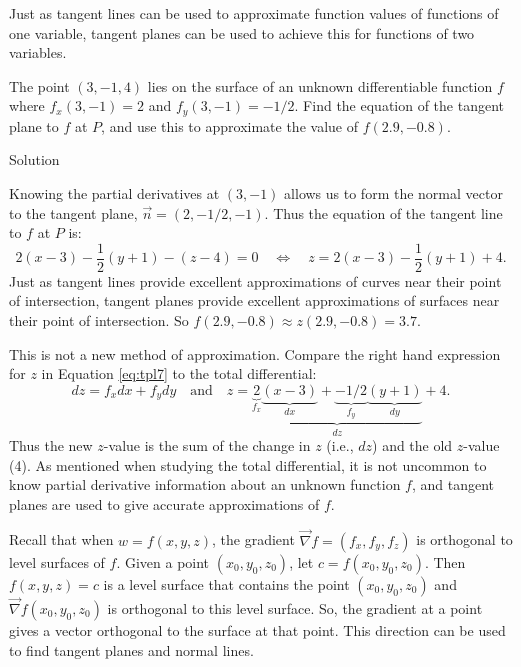 Just as tangent lines can be used to approximate function values of functions of one variable, tangent planes can be used to achieve this for functions of two variables. 


\begin{example}\label{ex_tpl7}
The point $(3,-1,4)$ lies on the surface of an unknown differentiable function $f$ where $f_x(3,-1) = 2$ and $f_y(3,-1) = -1/2$. Find the equation of the tangent plane to $f$ at $P$, and use this to approximate the value of $f(2.9,-0.8)$.

Solution 

Knowing the partial derivatives at $(3,-1)$ allows us to form the normal vector to the tangent plane, $\vec n = \left( 2,-1/2,-1\right)$. Thus the equation of the tangent line to $f$ at $P$ is:
\begin{equation}
2(x-3)-\dfrac{1}{2}(y+1) - (z-4) = 0 \quad \Leftrightarrow \quad z = 2(x-3)-\dfrac{1}{2}(y+1)+4.\label{eq:tpl7}\end{equation}
Just as tangent lines provide excellent approximations of curves near their point of intersection, tangent planes provide excellent approximations of surfaces near their point of intersection. So $f(2.9,-0.8) \approx z(2.9,-0.8) = 3.7.$

This is not a new method of approximation. Compare the right hand expression for $z$ in Equation \eqref{eq:tpl7} to the total differential:
$$dz = f_xdx + f_ydy \quad \text{and} \quad z = \underbrace{\underbrace{2}_{f_x}\underbrace{(x-3)}_{dx}+\underbrace{-1/2}_{f_y}\underbrace{(y+1)}_{dy}}_{dz}+4.$$
Thus the new $z$-value is the sum of the change in $z$ (i.e., $dz$) and the old $z$-value (4). As mentioned when studying the total differential, it is not uncommon to know partial derivative information about an unknown function $f$, and tangent planes are used to give accurate approximations of $f$.
\end{example}


Recall that when $w=f(x,y,z)$, the gradient $\vec{\nabla} f = \left( f_x,f_y,f_z\right)$ is orthogonal to level surfaces of $f$. Given a point $(x_0,y_0,z_0)$, let $c = f(x_0,y_0,z_0)$. Then $f(x,y,z) = c$ is a level surface that contains the point $(x_0,y_0,z_0)$ and $\vec{\nabla} f(x_0,y_0,z_0)$ is orthogonal to this level surface. So, the gradient at a point gives a vector orthogonal to the surface at that point. This direction can be used to find tangent planes and normal lines.

